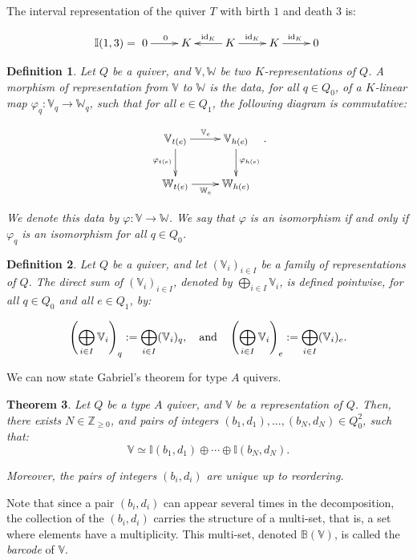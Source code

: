 \documentclass[11pt]{article}
\newtheorem{theorem}{Theorem}[section]
\newtheorem{definition}[theorem]{Definition}
\theoremstyle{remark}
\newcommand{\Z}{\mathbb{Z}}
\newcommand{\V}{\mathbb{V}}
\newcommand{\W}{\mathbb{W}}
\newcommand{\I}{\mathbb{I}}
\newcommand{\B}{\mathbb{B}}
\begin{document}
The interval representation of the quiver $T$ with birth $1$ and death $3$ is:

\[ \I(1,3)  = \xymatrix{
    0 \ar[r]^0 & K & K \ar[l]_{\text{id}_K} \ar[r]^{\text{id}_K} & K \ar[r]^{\text{id}_K} & 0 }
    \]



\begin{definition}
Let $Q$ be a quiver, and $\V,\W$ be two $K$-representations of $Q$. A morphism of representation from $\V$ to $\W$ is the data, for all $q \in Q_0$, of a $K$-linear map $\varphi_q : \V_q \to \W_q$, such that for all $e \in Q_1$, the following diagram is commutative:

$$\xymatrix{\V_{t(e)} \ar[r]^{\V_e} \ar[d]_{\varphi_{t(e)}} & \V_{h(e)} \ar[d]^{\varphi_{h(e)}} \\
\W_{t(e)} \ar[r]_{\W_e} & \W_{h(e)} }.$$

\noindent We denote this data by $\varphi : \V \longrightarrow \W$. We say that $\varphi$ is an isomorphism if and only if $\varphi_q$ is an isomorphism for all $q \in Q_0$.
\end{definition}


\begin{definition}
Let $Q$ be a quiver, and let $(\V_i)_{i\in I}$ be a family of representations of $Q$. The direct sum of $(\V_i)_{i\in I}$, denoted by $\bigoplus_{i\in I} \V_i$, is defined pointwise, for all $q \in Q_0$ and all $e \in Q_1$, by:

\[\left( \bigoplus_{i\in I} \V_i \right )_q := \bigoplus_{i\in I} (\V_i)_q, ~~~\textnormal{and}~~~ \left( \bigoplus_{i\in I} \V_i \right )_e := \bigoplus_{i\in I} (\V_i)_e. \]
\end{definition}

We can now state Gabriel's theorem for type $A$ quivers.

\begin{theorem}
Let $Q$ be a type $A$ quiver, and $\V$ be a representation of $Q$. Then, there exists $N \in \Z_{\geq 0}$, and pairs of integers $(b_1,d_1),...,(b_N,d_N)\in Q_0^2$, such that: $$\V \simeq \I(b_1,d_1)\oplus\cdots\oplus\I(b_N,d_N).$$ 

\noindent Moreover, the pairs of integers $(b_i,d_i)$ are unique up to reordering. 
\end{theorem}

Note that since a pair $(b_i,d_i)$ can appear several times in the decomposition, the collection of the $(b_i,d_i)$ carries the structure of a multi-set, that is, a set where elements have a multiplicity. This multi-set, denoted $\B(\V)$, is called the \emph{barcode} of $\V$.
\end{document}
